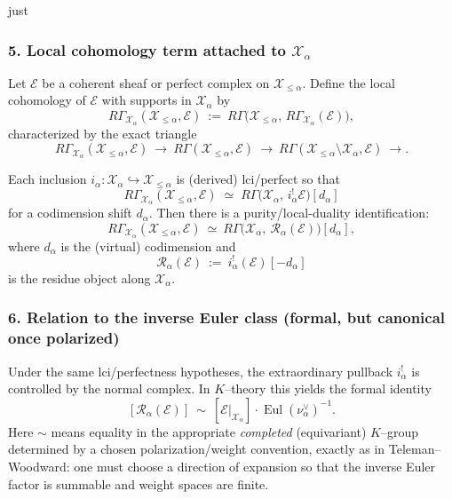 just \documentclass[12pt]{article}
\DeclareMathOperator{\Eul}{Eul}
\begin{document}
\subsubsection*{5. Local cohomology term attached to $\mathcal X_\alpha$}

Let $\mathcal E$ be a coherent sheaf or perfect complex on $\mathcal X_{\le\alpha}$.
Define the local cohomology of $\mathcal E$ with supports in $\mathcal X_\alpha$ by
\[
R\Gamma_{\mathcal X_\alpha}(\mathcal X_{\le\alpha},\mathcal E)
\ :=\
R\Gamma\bigl(\mathcal X_{\le\alpha},\,R\Gamma_{\mathcal X_\alpha}(\mathcal E)\bigr),
\]
characterized by the exact triangle
\[
R\Gamma_{\mathcal X_\alpha}(\mathcal X_{\le\alpha},\mathcal E)
\ \to\
R\Gamma(\mathcal X_{\le\alpha},\mathcal E)
\ \to\
R\Gamma(\mathcal X_{\le\alpha}\setminus \mathcal X_\alpha,\mathcal E)
\ \to.
\]

\begin{lemma}\label{lem:local-purity}
Each inclusion $i_\alpha:\mathcal X_\alpha\hookrightarrow \mathcal X_{\le\alpha}$ is (derived) lci/perfect so that
\[
R\Gamma_{\mathcal X_\alpha}(\mathcal X_{\le\alpha},\mathcal E)
\;\simeq\;
R\Gamma\bigl(\mathcal X_\alpha,\, i_\alpha^!\mathcal E\bigr)[d_\alpha]
\]
for a codimension shift $d_\alpha$.
Then there is a purity/local-duality identification:
\[
R\Gamma_{\mathcal X_\alpha}(\mathcal X_{\le\alpha},\mathcal E)
\ \simeq\
R\Gamma\bigl(\mathcal X_\alpha,\ \mathcal R_\alpha(\mathcal E)\bigr)[d_\alpha],
\]
where $d_\alpha$ is the (virtual) codimension and
\[
\mathcal R_\alpha(\mathcal E)\ :=\ i_\alpha^!(\mathcal E)[-d_\alpha]
\]
is the residue object along $\mathcal X_\alpha$.
\end{lemma}

\subsubsection*{6. Relation to the inverse Euler class (formal, but canonical once polarized)}

Under the same lci/perfectness hypotheses, the extraordinary pullback $i_\alpha^!$
is controlled by the normal complex.  In $K$--theory this yields the formal identity
\[
[\mathcal R_\alpha(\mathcal E)]
\ \sim\
[\mathcal E|_{\mathcal X_\alpha}]\cdot \Eul(\nu_\alpha^\vee)^{-1}.
\]
Here $\sim$ means equality in the appropriate \emph{completed} (equivariant)
$K$--group determined by a chosen polarization/weight convention, exactly as in
Teleman--Woodward: one must choose a direction of expansion so that the inverse
Euler factor is summable and weight spaces are finite.
\end{document}
